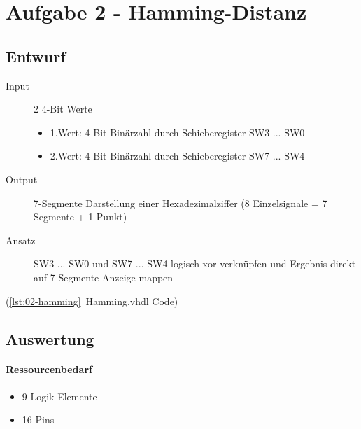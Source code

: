 \section{Aufgabe 2 - Hamming-Distanz}
\subsection{Entwurf}
\begin{description}
	\item[Input] 2 4-Bit Werte 
		\begin{itemize}
			\item 1.Wert: 4-Bit Binärzahl durch Schieberegister SW3 ... SW0
			\item 2.Wert: 4-Bit Binärzahl durch Schieberegister SW7 ... SW4
		\end{itemize}
	\item[Output] 7-Segmente Darstellung einer Hexadezimalziffer (8 Einzelsignale = 7 Segmente + 1 Punkt)
	\item[Ansatz] SW3 ... SW0 und SW7 ... SW4 logisch xor verknüpfen und Ergebnis direkt auf 7-Segmente Anzeige mappen
\end{description}	
(\ref{lst:02-hamming}~Hamming.vhdl Code)

\subsection{Auswertung}
\paragraph{Ressourcenbedarf}
\begin{itemize} 
\item 9 Logik-Elemente
\item 16 Pins 
\end{itemize}
